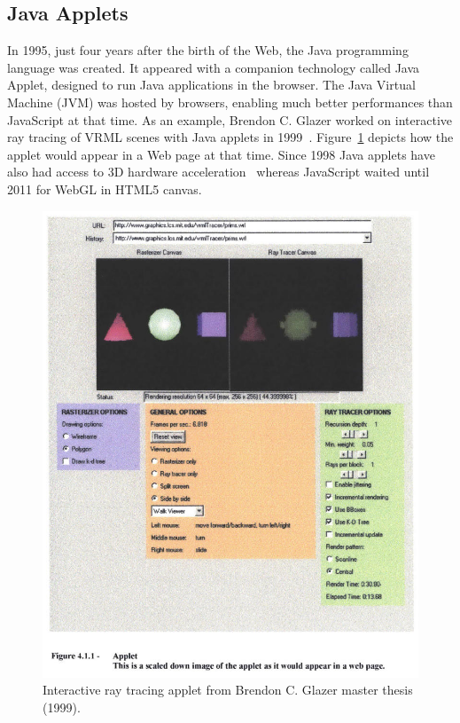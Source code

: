 \subsection{Java Applets}%
\label{sub:java_applets}

In 1995, just four years after the birth of the Web,
the Java programming language was created.
It appeared with a companion technology called Java Applet,
designed to run Java applications in the browser.
The Java Virtual Machine (JVM) was hosted by browsers,
enabling much better performances than JavaScript at that time.
As an example, Brendon C. Glazer worked on interactive ray tracing
of VRML scenes with Java applets in 1999~\cite{Glazer1999InteractiveRT}.
Figure~\ref{fig:glazer-thesis} depicts how the applet would appear
in a Web page at that time.
Since 1998 Java applets have also had access to 3D hardware acceleration~\cite{Java3dAPISpec}
whereas JavaScript waited until 2011 for WebGL in HTML5 canvas.

\begin{figure}[h!]
	\centering
	\includegraphics[width=\linewidth]{assets/img/glazer-thesis.jpg}
	\caption{Interactive ray tracing applet from Brendon C. Glazer master thesis (1999).}%
	\label{fig:glazer-thesis}
\end{figure}

